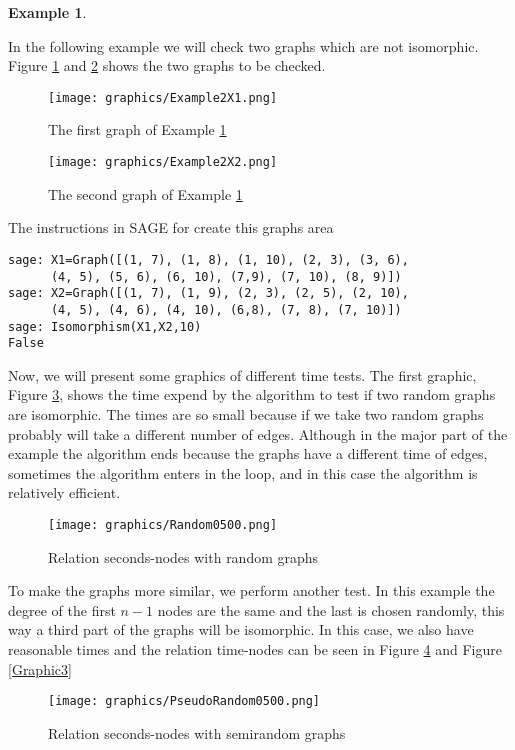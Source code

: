 \documentclass[12pt,a4paper]{book}
\theoremstyle{plain}
\theoremstyle{definition}
\newtheorem{example}{Example}
\theoremstyle{remark}
\begin{document}
\begin{example}\label{ImpTestEx2}

In the following  example we will check two graphs which  are not isomorphic. Figure \ref{Example2X1} and \ref{Example2X2} shows the two graphs 
 to be checked.
\begin{figure}
\centering
 \texttt{[image: graphics/Example2X1.png]}
 \caption{The first graph of Example \ref{ImpTestEx2}}\label{Example2X1}
\end{figure}

\begin{figure}
\centering
\texttt{[image: graphics/Example2X2.png]}
 \caption{The second graph of Example \ref{ImpTestEx2}}\label{Example2X2}
\end{figure}

The instructions in SAGE for create this graphs area
\begin{verbatim}
sage: X1=Graph([(1, 7), (1, 8), (1, 10), (2, 3), (3, 6),
      (4, 5), (5, 6), (6, 10), (7,9), (7, 10), (8, 9)])
sage: X2=Graph([(1, 7), (1, 9), (2, 3), (2, 5), (2, 10), 
      (4, 5), (4, 6), (4, 10), (6,8), (7, 8), (7, 10)])
sage: Isomorphism(X1,X2,10)
False  
\end{verbatim}

\end{example}

Now,  we will present some graphics of different time tests. The first graphic, Figure \ref{Graphic1}, shows the time expend by the 
algorithm to test if two random graphs are isomorphic. The times are so small because if we take two random graphs probably will 
take a different number of edges. Although in the major part of the example the algorithm ends because the graphs have a different 
time of edges, sometimes the algorithm enters in the loop, and in this case the algorithm is relatively efficient.
\begin{figure}
\centering
\texttt{[image: graphics/Random0500.png]}
\caption{Relation seconds-nodes with random graphs}\label{Graphic1}
\end{figure}

To make the graphs more similar, we perform another test. In this example the degree of the first $n-1$ nodes are the same and the last is 
chosen randomly, this way a third part of the graphs will be isomorphic. In this case,  we also have reasonable times and  the relation 
time-nodes can be seen in Figure \ref{Graphic2} and Figure \ref{Graphic3}

\begin{figure}
\centering
\texttt{[image: graphics/PseudoRandom0500.png]}
\caption{Relation seconds-nodes with semirandom graphs}\label{Graphic2}
\end{figure}
\end{document}
